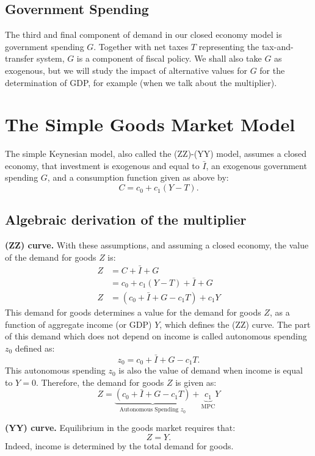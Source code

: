 \documentclass[]{book}
\theoremstyle{definition}
\theoremstyle{definition}
\theoremstyle{definition}
\theoremstyle{remark}
\begin{document}
\subsection{Government Spending}\label{government-spending}

The third and final component of demand in our closed economy model is
government spending \(G\). Together with net taxes \(T\) representing
the tax-and-transfer system, \(G\) is a component of fiscal policy. We
shall also take \(G\) as exogenous, but we will study the impact of
alternative values for \(G\) for the determination of GDP, for example
(when we talk about the multiplier).

\hypertarget{simple}{\section{The Simple Goods Market
Model}\label{simple}}

The simple Keynesian model, also called the (ZZ)-(YY) model, assumes a
closed economy, that investment is exogenous and equal to \(\bar{I}\),
an exogenous government spending \(G\), and a consumption function given
as above by: \[C=c_0+c_1\left(Y-T\right).\]

\subsection{Algebraic derivation of the
multiplier}\label{algebraic-derivation-of-the-multiplier}

\textbf{(ZZ) curve.} With these assumptions, and assuming a closed
economy, the value of the demand for goods \(Z\) is: \[
\begin{aligned}
Z   &=C+\bar{I}+G\\
    &=c_{0}+c_{1}\left(Y-T\right)+\bar{I}+G\\
Z   &=\left(c_{0}+\bar{I}+G-c_{1}T\right)+c_{1}Y
\end{aligned}
\] This demand for goods determines a value for the demand for goods
\(Z\), as a function of aggregate income (or GDP) \(Y\), which defines
the (ZZ) curve. The part of this demand which does not depend on income
is called autonomous spending \(z_0\) defined as:
\[z_0=c_{0}+\bar{I}+G-c_{1}T.\] This autonomous spending \(z_0\) is also
the value of demand when income is equal to \(Y=0\). Therefore, the
demand for goods \(Z\) is given as:
\[Z=\underbrace{\left(c_{0}+\bar{I}+G-c_{1}T\right)}_{\text{Autonomous Spending }z_{0}}+\underbrace{c_{1}}_{\text{MPC}}Y\]

\textbf{(YY) curve.} Equilibrium in the goods market requires that:
\[Z=Y.\] Indeed, income is determined by the total demand for goods.
\end{document}
